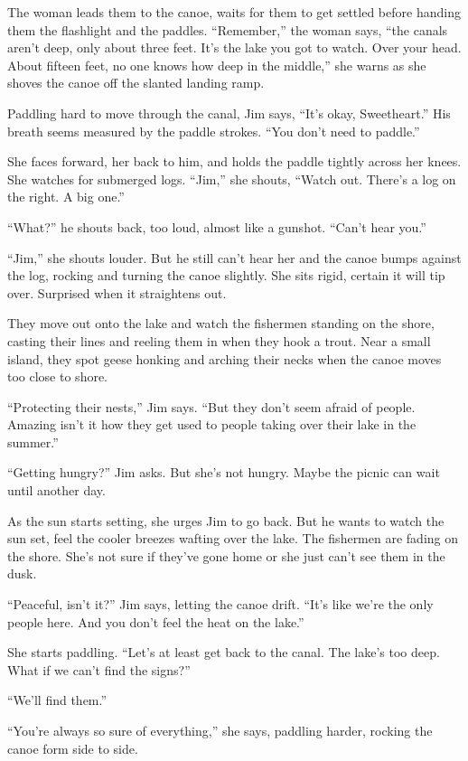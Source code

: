 \documentclass[twoside,10pt]{book}
\begin{document}
The woman leads them to the canoe, waits for them to get settled before
handing them the flashlight and the paddles. ``Remember,'' the woman
says, ``the canals aren't deep, only about three feet. It's the lake you
got to watch. Over your head. About fifteen feet, no one knows how deep
in the middle,'' she warns as she shoves the canoe off the slanted
landing ramp.

Paddling hard to move through the canal, Jim says, ``It's okay,
Sweetheart.'' His breath seems measured by the paddle strokes. ``You
don't need to paddle.''

She faces forward, her back to him, and holds the paddle tightly across
her knees. She watches for submerged logs. ``Jim,'' she shouts, ``Watch
out. There's a log on the right. A big one.''

``What?'' he shouts back, too loud, almost like a gunshot. ``Can't hear
you.''

``Jim,'' she shouts louder. But he still can't hear her and the canoe
bumps against the log, rocking and turning the canoe slightly. She sits
rigid, certain it will tip over. Surprised when it straightens out.

They move out onto the lake and watch the fishermen standing on the
shore, casting their lines and reeling them in when they hook a trout.
Near a small island, they spot geese honking and arching their necks
when the canoe moves too close to shore.

``Protecting their nests,'' Jim says. ``But they don't seem afraid of
people. Amazing isn't it how they get used to people taking over their
lake in the summer.''

``Getting hungry?'' Jim asks. But she's not hungry. Maybe the picnic can
wait until another day.

As the sun starts setting, she urges Jim to go back. But he wants to
watch the sun set, feel the cooler breezes wafting over the lake. The
fishermen are fading on the shore. She's not sure if they've gone home
or she just can't see them in the dusk.

``Peaceful, isn't it?'' Jim says, letting the canoe drift. ``It's like
we're the only people here. And you don't feel the heat on the lake.''

She starts paddling. ``Let's at least get back to the canal. The lake's
too deep. What if we can't find the signs?''

``We'll find them.''

``You're always so sure of everything,'' she says, paddling harder,
rocking the canoe form side to side.
\end{document}
